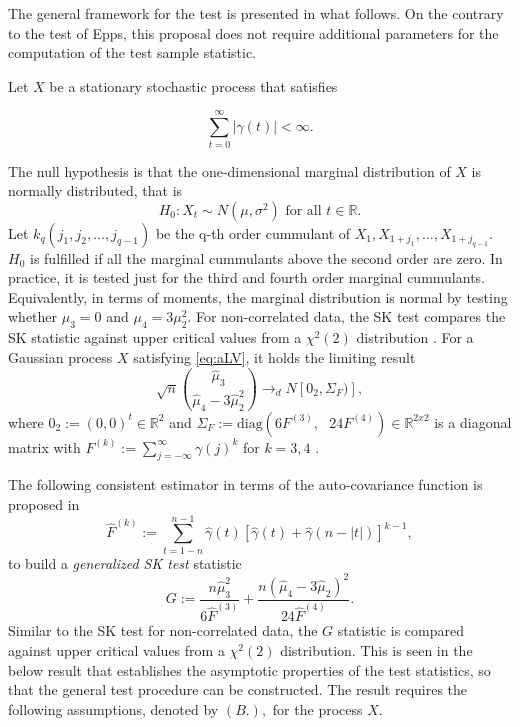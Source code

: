 The general framework for the test is presented in what follows. On the contrary to the test of Epps, this proposal does not require additional parameters for the computation of the test sample statistic.

Let \(X\) be a stationary stochastic process that satisfies

\begin{equation}
 \sum_{t=0}^{\infty}|\gamma(t)| <\infty. \label{eq:aLV}
\end{equation}

The null hypothesis is that the one-dimensional marginal distribution of \(X\) is normally distributed, that is
\[
H_0: X_t \sim N(\mu,\sigma^2) \text{ for all } t \in \mathbb{R}.
\]
Let \(k_q(j_1,j_2,\ldots,j_{q-1})\) be the q-th order cummulant of \(X_{1},X_{1+j_1},\ldots,X_{1+j_{q-1}}\). \(H_0\) is fulfilled if all the marginal cummulants above the second order are zero. In practice, it is tested just for the third and fourth order marginal cummulants. Equivalently, in terms of moments, the marginal distribution is normal by testing whether \(\mu_3 = 0\) and \(\mu_4 = 3 \mu_2^2\). For non-correlated data, the SK test compares the SK statistic against upper critical values from a \(\chi^2(2)\) distribution \citep{bai2005}. For a Gaussian process \(X\) satisfying \eqref{eq:aLV}, it holds the limiting result
\[
 \sqrt{n} \binom{\widehat{\mu}_3}{\widehat{\mu}_4 -3\widehat{\mu}^2_2} \to_d N[0_2,\Sigma_F)],
\]
where \(0_2 := (0,0)^t \in \mathbb{R}^2\) and \(\Sigma_F := \mbox{diag}(6F^{(3)}, \text{ } 24F^{(4)}) \in \mathbb{R}^{2x2}\) is a diagonal matrix with \(F^{(k)} := \sum_{j = -\infty}^{\infty}\gamma(j)^k\) for \(k=3,4\) \citep{Gasser1975}.

The following consistent estimator in terms of the auto-covariance function is proposed in \citet{Lobato2004}
\[
 \widehat{F}^{(k)} := \sum_{t = 1-n}^{n-1}\widehat{\gamma}(t)[\widehat{\gamma}(t) +\widehat{\gamma}(n-|t|)]^{k-1},
\]
to build a \emph{generalized SK test} statistic
\[
 G := \dfrac{n \widehat{\mu}_3^2}{6 \widehat{F}^{(3)}} + \dfrac{n(\widehat{\mu}_4 -3\widehat{\mu}_2)^2}{24\widehat{F}^{(4)}}.
\]
Similar to the SK test for non-correlated data, the \(G\) statistic is compared against upper critical values from a \(\chi^2(2)\) distribution. This is seen in the below result that establishes the asymptotic properties of the test statistics, so that the general test procedure can be constructed. The result requires the following assumptions, denoted by \((B.),\) for the process \(X.\)

